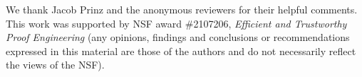 \documentclass[sigplan,screen]{acmart}
\begin{document}


\maketitle











\begin{acks}
  We thank Jacob Prinz and the anonymous reviewers for their helpful
  comments.  This work was supported by NSF award \#2107206, {\em
    Efficient and Trustworthy Proof Engineering} (any opinions,
  findings and conclusions or recommendations expressed in this
  material are those of the authors and do not necessarily reflect the
  views of the NSF).
\end{acks}





\end{document}
